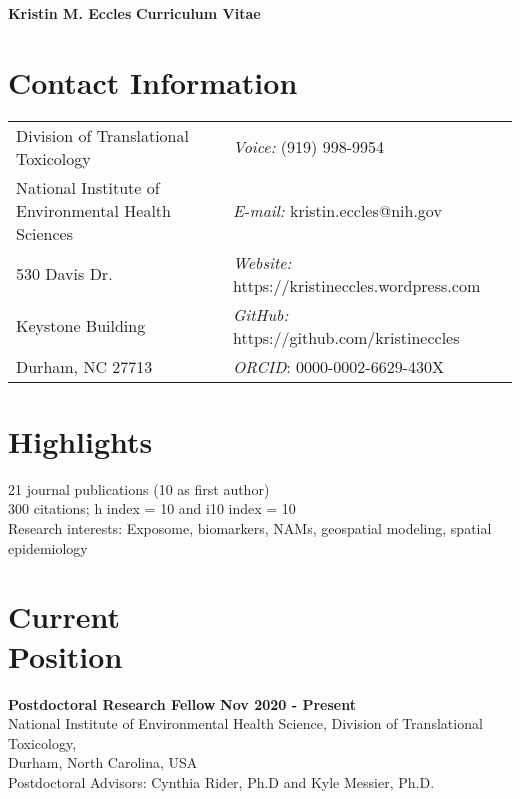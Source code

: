 \documentclass[margin,line]{res}
\begin{document}
\begin{flushleft}
		\huge \textbf{Kristin M. Eccles}
		\hfill {\LARGE \textbf{Curriculum Vitae}}\\
\end{flushleft}


\begin{resume}
\section{\sc Contact Information}
\vspace{.05in}
\begin{tabular}{@{}p{3.2in}p{2.5in}}
Division of Translational Toxicology & {\it Voice:}  (919) 998-9954 \\
National Institute of Environmental Health Sciences & {\it E-mail:}  kristin.eccles@nih.gov\\
530 Davis Dr.&{\it Website:} https://kristineccles.wordpress.com  \\
Keystone Building  & {\it GitHub:} https://github.com/kristineccles \\
Durham, NC 27713 & {\it ORCID}: 0000-0002-6629-430X

\end{tabular}

\vspace*{.1in}
\section{\sc Highlights}
21 journal publications (10 as first author)
\\
300 citations; h index = 10 and i10 index = 10
\\
Research interests: Exposome, biomarkers, NAMs, geospatial modeling, spatial epidemiology

\vspace*{.1in}
\section{\sc Current\\Position}
{\bf  Postdoctoral Research Fellow} \hfill {\bf Nov 2020 - Present}\\
National Institute of Environmental Health Science, Division of Translational Toxicology,\\
Durham, North Carolina, USA\\
Postdoctoral Advisors: Cynthia Rider, Ph.D and Kyle Messier, Ph.D.

\vspace*{.1in}

\end{resume}
\end{document}
